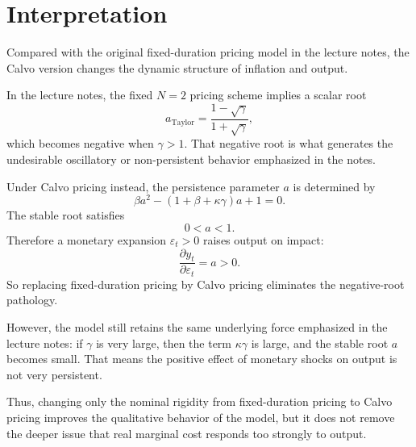 \documentclass[11pt]{article}
\begin{document}
\section{Interpretation}

Compared with the original fixed-duration pricing model in the lecture notes, the Calvo version
changes the dynamic structure of inflation and output.

In the lecture notes, the fixed $N=2$ pricing scheme implies a scalar root
\begin{equation}
a_{\text{Taylor}} = \frac{1-\sqrt{\gamma}}{1+\sqrt{\gamma}},
\end{equation}
which becomes negative when $\gamma>1$. That negative root is what generates the undesirable
oscillatory or non-persistent behavior emphasized in the notes.

Under Calvo pricing instead, the persistence parameter $a$ is determined by
\begin{equation}
\beta a^2 - (1+\beta+\kappa\gamma)a + 1 = 0.
\end{equation}
The stable root satisfies
\begin{equation}
0<a<1.
\end{equation}
Therefore a monetary expansion $\varepsilon_t>0$ raises output on impact:
\begin{equation}
\frac{\partial y_t}{\partial \varepsilon_t} = a > 0.
\end{equation}
So replacing fixed-duration pricing by Calvo pricing eliminates the negative-root pathology.

However, the model still retains the same underlying force emphasized in the lecture notes:
if $\gamma$ is very large, then the term $\kappa\gamma$ is large, and the stable root $a$ becomes small.
That means the positive effect of monetary shocks on output is not very persistent.

Thus, changing only the nominal rigidity from fixed-duration pricing to Calvo pricing improves the
qualitative behavior of the model, but it does not remove the deeper issue that real marginal cost
responds too strongly to output.
\end{document}
